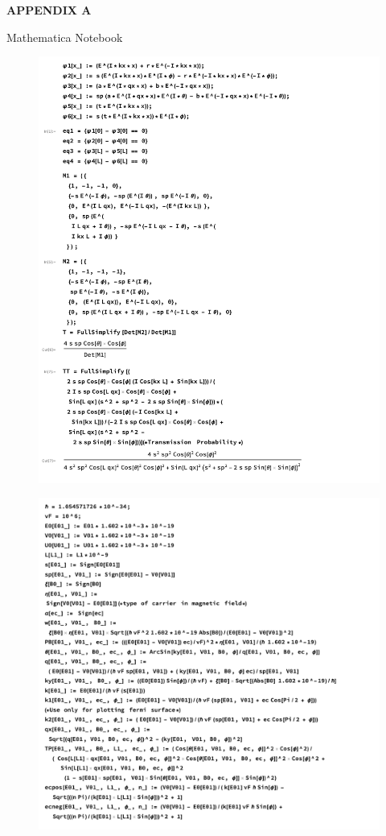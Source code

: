 \vspace*{\fill}
\centerline{\textbf{APPENDIX A}}
\centerline{Mathematica Notebook}
\vspace*{\fill}
\newpage

\begin{figure}[H]
    
    \includegraphics[width=\linewidth]{fig/mathe1.png}
        
\end{figure}
\begin{figure}[H]
    
    \includegraphics[width=\linewidth]{fig/mathe2.png}
        
\end{figure}